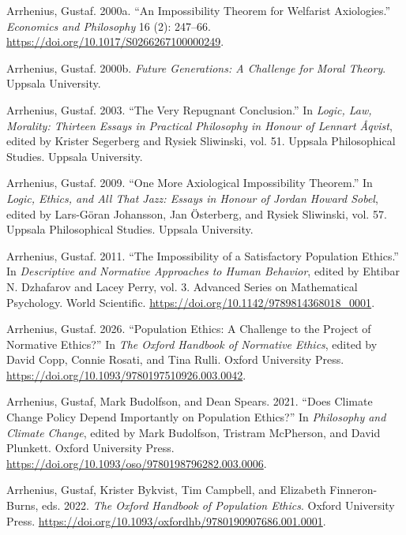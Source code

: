 \documentclass[
  11pt,
  letterpaper,
  DIV=11,
  numbers=noendperiod,
  twoside]{scrartcl}
\newlength{\cslhangindent}
\newenvironment{CSLReferences}[2] %
 {\begin{list}{}{%
  \setlength{\itemindent}{0pt}
  \setlength{\leftmargin}{0pt}
  \setlength{\parsep}{0pt}
  \ifodd #1
   \setlength{\leftmargin}{\cslhangindent}
   \setlength{\itemindent}{-1\cslhangindent}
  \fi
  \setlength{\itemsep}{#2\baselineskip}}}
 {\end{list}}
\begin{document}
\protect{}\label{refs}
\begin{CSLReferences}{1}{1}
Arrhenius, Gustaf. 2000a. {``An Impossibility Theorem for Welfarist
Axiologies.''} \emph{Economics and Philosophy} 16 (2): 247--66.
\url{https://doi.org/10.1017/S0266267100000249}.

Arrhenius, Gustaf. 2000b. \emph{Future Generations: A Challenge for
Moral Theory}. Uppsala University.

Arrhenius, Gustaf. 2003. {``The Very Repugnant Conclusion.''} In
\emph{Logic, Law, Morality: Thirteen Essays in Practical Philosophy in
Honour of Lennart {Å}qvist}, edited by Krister Segerberg and Rysiek
Sliwinski, vol. 51. Uppsala Philosophical Studies. Uppsala University.

Arrhenius, Gustaf. 2009. {``One More Axiological Impossibility
Theorem.''} In \emph{Logic, Ethics, and All That Jazz: Essays in Honour
of Jordan Howard Sobel}, edited by Lars-Göran Johansson, Jan Österberg,
and Rysiek Sliwinski, vol. 57. Uppsala Philosophical Studies. Uppsala
University.

Arrhenius, Gustaf. 2011. {``The Impossibility of a Satisfactory
Population Ethics.''} In \emph{Descriptive and Normative Approaches to
Human Behavior}, edited by Ehtibar N. Dzhafarov and Lacey Perry, vol. 3.
Advanced Series on Mathematical Psychology. World Scientific.
\url{https://doi.org/10.1142/9789814368018_0001}.

Arrhenius, Gustaf. 2026. {``Population Ethics: A Challenge to the
Project of Normative Ethics?''} In \emph{The Oxford Handbook of
Normative Ethics}, edited by David Copp, Connie Rosati, and Tina Rulli.
Oxford University Press.
\url{https://doi.org/10.1093/9780197510926.003.0042}.

Arrhenius, Gustaf, Mark Budolfson, and Dean Spears. 2021. {``Does
Climate Change Policy Depend Importantly on Population Ethics?''} In
\emph{Philosophy and Climate Change}, edited by Mark Budolfson, Tristram
McPherson, and David Plunkett. Oxford University Press.
\url{https://doi.org/10.1093/oso/9780198796282.003.0006}.

Arrhenius, Gustaf, Krister Bykvist, Tim Campbell, and Elizabeth
Finneron-Burns, eds. 2022. \emph{The Oxford Handbook of Population
Ethics}. Oxford University Press.
\url{https://doi.org/10.1093/oxfordhb/9780190907686.001.0001}.


\end{CSLReferences}
\end{document}
